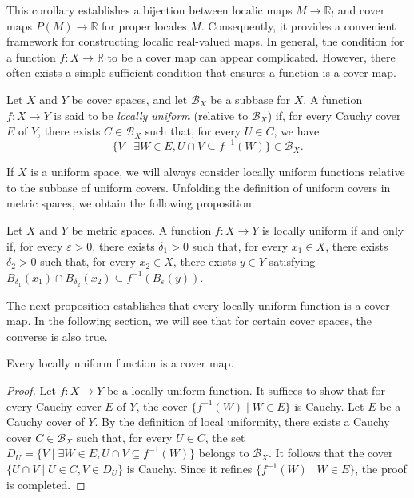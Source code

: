 \documentclass[reqno]{amsart}
\theoremstyle{definition}
\theoremstyle{remark}
\numberwithin{figure}{section}
\begin{document}
This corollary establishes a bijection between localic maps $M \to \mathbb{R}_l$ and cover maps $P(M) \to \mathbb{R}$ for proper locales $M$.
Consequently, it provides a convenient framework for constructing localic real-valued maps.
In general, the condition for a function $f : X \to \mathbb{R}$ to be a cover map can appear complicated.
However, there often exists a simple sufficient condition that ensures a function is a cover map.

\begin{defn}
Let $X$ and $Y$ be cover spaces, and let $\mathcal{B}_X$ be a subbase for $X$.
A function $f : X \to Y$ is said to be \emph{locally uniform} (relative to $\mathcal{B}_X$) if, for every Cauchy cover $E$ of $Y$,
there exists $C \in \mathcal{B}_X$ such that, for every $U \in C$, we have
\[ \{ V \mid \exists W \in E, U \cap V \subseteq f^{-1}(W) \} \in \mathcal{B}_X. \]
\end{defn}

If $X$ is a uniform space, we will always consider locally uniform functions relative to the subbase of uniform covers.
Unfolding the definition of uniform covers in metric spaces, we obtain the following proposition:

\begin{prop}
Let $X$ and $Y$ be metric spaces.
A function $f : X \to Y$ is locally uniform if and only if, for every $\varepsilon > 0$, there exists $\delta_1 > 0$ such that,
for every $x_1 \in X$, there exists $\delta_2 > 0$ such that, for every $x_2 \in X$, there exists $y \in Y$ satisfying $B_{\delta_1}(x_1) \cap B_{\delta_2}(x_2) \subseteq f^{-1}(B_\varepsilon(y))$.
\end{prop}

The next proposition establishes that every locally uniform function is a cover map.
In the following section, we will see that for certain cover spaces, the converse is also true.

\begin{prop}
Every locally uniform function is a cover map.
\end{prop}
\begin{proof}
Let $f : X \to Y$ be a locally uniform function.
It suffices to show that for every Cauchy cover $E$ of $Y$, the cover $\{ f^{-1}(W) \mid W \in E \}$ is Cauchy.
Let $E$ be a Cauchy cover of $Y$.
By the definition of local uniformity, there exists a Cauchy cover $C \in \mathcal{B}_X$ such that, for every $U \in C$, the set
$D_U = \{ V \mid \exists W \in E, U \cap V \subseteq f^{-1}(W) \}$
belongs to $\mathcal{B}_X$.
It follows that the cover $\{ U \cap V \mid U \in C, V \in D_U \}$ is Cauchy.
Since it refines $\{ f^{-1}(W) \mid W \in E \}$, the proof is completed.
\end{proof}
\end{document}
